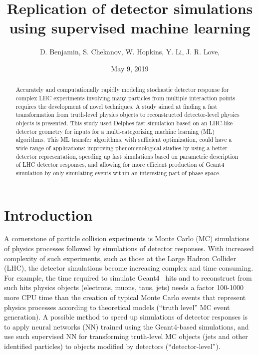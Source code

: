 \documentclass[showpacs,showkeys,preprint,prd,nofootinbib,linenumbers,12pt]{revtex4-1}
\begin{document}


\date{May 9, 2019}

\vspace{2.5cm}

\title{
  Replication of detector simulations using supervised machine learning 
}


\author{D. Benjamin, S. Chekanov, W. Hopkins, Y. Li, J. R. Love,}
% 



\begin{abstract}
Accurately and computationally rapidly modeling stochastic detector response for complex LHC experiments involving many particles from multiple interaction points requires the development of novel techniques. A study aimed at finding a fast transformation from truth-level physics objects to reconstructed detector-level physics objects is presented. This study used Delphes fast simulation based on an LHC-like detector geometry for inputs for a multi-categorizing machine learning (ML) algorithms. This ML transfer algorithms, with sufficient optimization, could have a wide range of applications: improving phenomenological studies by using a better detector representation, speeding up fast simulations based on parametric description of LHC detector responses, and allowing for more efficient production of Geant4 simulation by only simulating events within an interesting part of phase space.
\end{abstract}

\maketitle

\section{Introduction}

A cornerstone of particle collision experiments is Monte Carlo (MC) simulations of physics processes followed by simulations of detector responses. With increased complexity of such experiments, such as those at the Large Hadron Collider (LHC), the detector simulations become increasing complex and time consuming.  For example, the time required to simulate Geant4~\cite{Agostinelli:2002hh} hits and to reconstruct from such hits physics objects (electrons, muons, taus, jets) needs a factor 100-1000 more CPU time than the creation of typical Monte Carlo events that represent physics processes according to theoretical models (``truth level'' MC event generation).  A possible method to speed up simulations of detector responses is to apply neural networks (NN) trained using the Geant4-based simulations, and use such supervised NN for transforming truth-level MC objects (jets and other identified particles) to objects modified by detectors (``detector-level'').  
\end{document}
